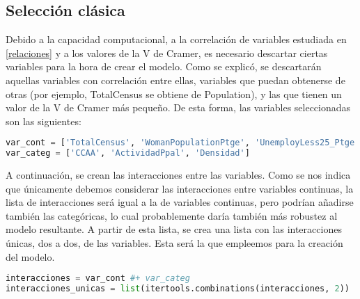 \documentclass[a4paper,onecolumn]{extarticle}
\begin{document}
\begin{sloppypar}
\subsection{Selección clásica}\label{linclasica}
Debido a la capacidad computacional, a la correlación de variables estudiada en \ref{relaciones} y a los valores de la V de Cramer, es necesario descartar 
ciertas variables para la hora de crear el modelo. Como se explicó, se descartarán aquellas variables con correlación entre ellas, variables que puedan obtenerse
de otras (por ejemplo, TotalCensus se obtiene de Population), y las que tienen un valor de la V de Cramer más pequeño. De esta forma, las variables seleccionadas
son las siguientes:
\begin{lstlisting}[language=Python]
var_cont = ['TotalCensus', 'WomanPopulationPtge', 'UnemployLess25_Ptge', 'Unemploy25_40_Ptge', 'UnemployMore40_Ptge', 'AgricultureUnemploymentPtge', 'IndustryUnemploymentPtge', 'ConstructionUnemploymentPtge', 'ServicesUnemploymentPtge', 'PobChange_pct', 'PersonasInmueble', 'Explotaciones']
var_categ = ['CCAA', 'ActividadPpal', 'Densidad']
\end{lstlisting}

A continuación, se crean las interacciones entre las variables. Como se nos indica que únicamente debemos considerar las interacciones entre variables continuas,
la lista de interacciones será igual a la de variables continuas, pero podrían añadirse también las categóricas, lo cual probablemente daría también más robustez 
al modelo resultante. A partir de esta lista, se crea una lista con las interacciones únicas, dos a dos, de las variables. Esta será la que empleemos para la 
creación del modelo.
\begin{lstlisting}[language=Python]
interacciones = var_cont #+ var_categ
interacciones_unicas = list(itertools.combinations(interacciones, 2))
\end{lstlisting}


\end{sloppypar}
\end{document}
